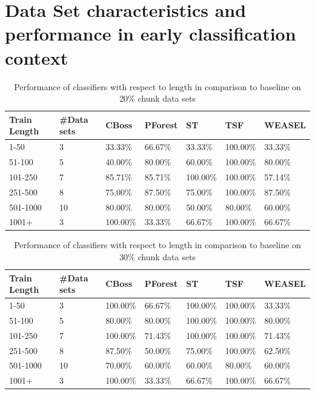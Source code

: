   \section{Data Set characteristics and performance in early classification context}
  \label{AppendixDataCharacteristis}
        \begin{table}[!ht]
            \setlength\extrarowheight{2pt} %
            \begin{tabularx}{\textwidth}{|X|X|X|X|X|X|X|}
            \hline
            \textbf{Train Length} & \textbf{\#Data sets} & \textbf{CBoss} & \textbf{PForest} & \textbf{ST} & \textbf{TSF} & \textbf{WEASEL} \\ \hline
                1-50 & 3 & 33.33\% & 66.67\% & 33.33\% & 100.00\% & 33.33\% \\ \hline
                51-100 & 5 & 40.00\% & 80.00\% & 60.00\% & 100.00\% & 80.00\% \\ \hline
                101-250 & 7 & 85.71\% & 85.71\% & 100.00\% & 100.00\% & 57.14\% \\ \hline
                251-500 & 8 & 75.00\% & 87.50\% & 75.00\% & 100.00\% & 87.50\% \\ \hline
                501-1000 & 10 & 80.00\% & 80.00\% & 50.00\% & 80.00\% & 60.00\% \\ \hline
                1001+ & 3 & 100.00\% & 33.33\% & 66.67\% & 100.00\% & 66.67\% \\ \hline
            \end{tabularx}
            \caption{Performance of classifiers with respect to length in comparison to baseline on 20\% chunk data sets}
        \end{table}

        \begin{table}[!ht]
            \setlength\extrarowheight{2pt} %
            \begin{tabularx}{\textwidth}{|X|X|X|X|X|X|X|}
            \hline
            \textbf{Train Length} & \textbf{\#Data sets} & \textbf{CBoss} & \textbf{PForest} & \textbf{ST} & \textbf{TSF} & \textbf{WEASEL} \\ \hline
                1-50 & 3 & 100.00\% & 66.67\% & 100.00\% & 100.00\% & 33.33\%\\ \hline
                51-100 & 5 & 80.00\% & 80.00\% & 100.00\% & 100.00\% & 80.00\% \\ \hline
                101-250 & 7 & 100.00\% & 71.43\% & 100.00\% & 100.00\% & 71.43\% \\ \hline
                251-500 & 8 & 87.50\% & 50.00\% & 75.00\% & 100.00\% & 62.50\% \\ \hline
                501-1000 & 10 &70.00\% & 60.00\% & 60.00\% & 80.00\% & 60.00\% \\ \hline
                1001+ & 3 & 100.00\% & 33.33\% & 66.67\% & 100.00\% & 66.67\% \\ \hline
            \end{tabularx}
            \caption{Performance of classifiers with respect to length in comparison to baseline on 30\% chunk data sets}
        \end{table}

